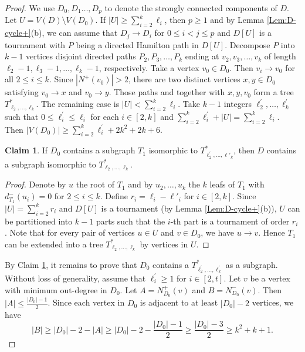 \documentclass[11pt,a4paper]{article}
\theoremstyle{definition}
\newtheorem{claim}{Claim}
\begin{document}
\begin{proof}
    We use  $D_0,D_1\ldots,D_p$ to denote the strongly connected components  of $D$. Let $U=V(D)\setminus V(D_0)$. If $|U|\geq \sum_{i=2}^k{\ell_i}$, then $p\geq 1$ and by Lemma \ref{Lem:D-cycle+}(b), we can assume that $D_j\rightarrow D_i$ for $0\le i < j\le p$ and $D[U]$ is a tournament with $P$ being a directed Hamilton path in $D[U]$. Decompose $P$ into $k-1$ vertices disjoint directed paths $P_2,P_3,\ldots,P_k$ ending at $v_2,v_3,\ldots,v_k$ of length  $\ell_2-1,\ell_3-1, \ldots, \ell_k -1$, respectively.
    Take a vertex $v_0\in D_0$. Then $v_i\rightarrow v_0$ for all $2\leq i\leq k$.
    Since $|N^+(v_0)|>2$,  there are two distinct vertices $x,y\in D_0$ satisfying $v_0\rightarrow x$ and $v_0\rightarrow y$. Those paths and together with $x,y,v_0$ form a tree $T^*_{\ell_2, \ldots, \ell_k}$.
    The remaining case is  $|U|<\sum_{i=2}^k{\ell_i}$. Take $k-1$ integers $\ell^\prime_2, \ldots, \ell^\prime_k$  such that $0\leq \ell^\prime_i\le \ell_i$ for each $i\in[2,k]$ and $\sum_{i=2}^k{\ell^\prime_i}+|U|= \sum_{i=2}^k{\ell_i}$. Then $|V(D_0)|\geq\sum_{i=2}^k{\ell^\prime_i}+2k^2+2k+6$.
   \begin{claim}\label{claim:D-2}
        If $D_0$ contains a  subgraph $T_1$ isomorphic to   $T^*_{ \ell^{\prime}  _2, \ldots, \ell'_k}$, then $D$ contains  a   subgraph isomorphic to   $T^*_ {\ell_2, \ldots, \ell_k}$.
   \end{claim}
 \begin{proof}
  Denote by $u$ the root of $T_1$ and by $u_2,\ldots,u_k$  the $k$ leafs of $T_1$ with $d^-_{T_1}(u_i)=0$ for $2\leq i\leq k$.    Define $r_i = \ell_i - \ell'_i$ for $i \in [2, k]$.  Since $|U|=\sum_{i=2}^k r_i$ and $D[U]$ is a tournament (by Lemma \ref{Lem:D-cycle+}(b)), $U$ can be partitioned into $k-1$ parts such that the $i$-th part is a tournament of order $r_i$. Note that for every pair of vertices $u\in U$ and $v\in D_0$, we have $u\rightarrow v$. Hence $T_1$ can be extended into a tree $T^*_ {  \ell_2, \ldots, \ell_k}$ by vertices in $U$.
 \end{proof}


By Claim \ref{claim:D-2}, it remains to prove that $D_0$ contains a  $T^*_{ \ell^{\prime}_2, \ldots, \ell^{\prime}  _k}$ as a subgraph. Without loss of generality, assume that $\ell^{\prime}_i\geq 1$ for $i\in [2,t]$.
Let $v$ be a vertex with minimum out-degree in $D_0$. Let $A=N^+_{D_0}(v)$ and $B=N^-_{D_0}(v)$. Then $|A|\leq \frac{ |D_0|-1}{2}$. Since each vertex in $D_0$ is adjacent to at least $|D_0|-2$ vertices, we have
\begin{equation}\label{bound:B}
    |B|\geq |D_0|-2-|A|\geq |D_0|-2-\frac{ |D_0|-1}{2}\geq \frac{ |D_0|-3}{2}\geq k^2+k+1.
\end{equation}


\end{proof}
\end{document}
